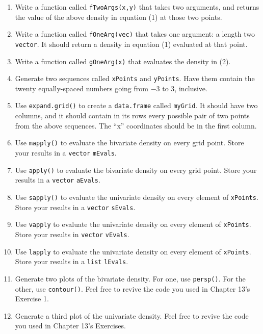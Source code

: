 \documentclass[12pt,krantz2]{krantz}
\providecommand{\tightlist}{%
  \setlength{\itemsep}{0pt}\setlength{\parskip}{0pt}}
\begin{document}
\begin{enumerate}
\def\labelenumi{\alph{enumi})}
\tightlist
\item
  Write a function called \texttt{fTwoArgs(x,y)} that takes two arguments, and returns the value of the above density in equation (1) at those two points.
\item
  Write a function called \texttt{fOneArg(vec)} that takes one argument: a length two \texttt{vector}. It should return a density in equation (1) evaluated at that point.
\item
  Write a function called \texttt{gOneArg(x)} that evaluates the density in (2).
\item
  Generate two sequences called \texttt{xPoints} and \texttt{yPoints}. Have them contain the twenty equally-spaced numbers going from \(-3\) to \(3\), inclusive.
\item
  Use \texttt{expand.grid()} to create a \texttt{data.frame} called \texttt{myGrid}. It should have two columns, and it should contain in its rows every possible pair of two points from the above sequences. The ``x'' coordinates should be in the first column.
\item
  Use \texttt{mapply()} to evaluate the bivariate density on every grid point. Store your results in a \texttt{vector} \texttt{mEvals}.
\item
  Use \texttt{apply()} to evaluate the bivariate density on every grid point. Store your results in a \texttt{vector} \texttt{aEvals}.
\item
  Use \texttt{sapply()} to evaluate the univariate density on every element of \texttt{xPoints}. Store your results in a \texttt{vector} \texttt{sEvals}.
\item
  Use \texttt{vapply} to evaluate the univariate density on every element of \texttt{xPoints}. Store your results in \texttt{vector} \texttt{vEvals}.
\item
  Use \texttt{lapply} to evaluate the univariate density on every element of \texttt{xPoints}. Store your results in a \texttt{list} \texttt{lEvals}.
\item
  Generate two plots of the bivariate density. For one, use \texttt{persp()}. For the other, use \texttt{contour()}. Feel free to revive the code you used in Chapter 13's Exercise 1.
\item
  Generate a third plot of the univariate density. Feel free to revive the code you used in Chapter 13's Exercises.
\end{enumerate}
\end{document}
